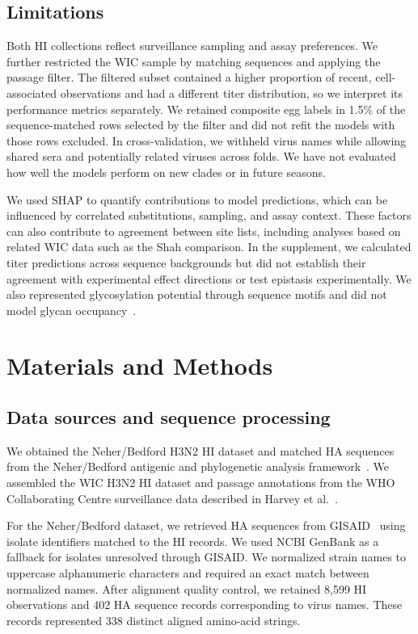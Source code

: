 \documentclass[12pt]{article}
\begin{document}
\subsection{Limitations}

Both HI collections reflect surveillance sampling and assay preferences. We further restricted the WIC sample by matching sequences and applying the passage filter. The filtered subset contained a higher proportion of recent, cell-associated observations and had a different titer distribution, so we interpret its performance metrics separately. We retained composite egg labels in 1.5\% of the sequence-matched rows selected by the filter and did not refit the models with those rows excluded. In cross-validation, we withheld virus names while allowing shared sera and potentially related viruses across folds. We have not evaluated how well the models perform on new clades or in future seasons.

We used SHAP to quantify contributions to model predictions, which can be influenced by correlated substitutions, sampling, and assay context. These factors can also contribute to agreement between site lists, including analyses based on related WIC data such as the Shah comparison. In the supplement, we calculated titer predictions across sequence backgrounds but did not establish their agreement with experimental effect directions or test epistasis experimentally. We also represented glycosylation potential through sequence motifs and did not model glycan occupancy~\cite{Das2011PNAS_glycan, Kosik2018PLoSPathog, Altman2019mBio, Zost2017PNAS}.

\section{Materials and Methods}

\subsection{Data sources and sequence processing}

We obtained the Neher/Bedford H3N2 HI dataset and matched HA sequences from the Neher/Bedford antigenic and phylogenetic analysis framework~\cite{Neher2016PNAS}. We assembled the WIC H3N2 HI dataset and passage annotations from the WHO Collaborating Centre surveillance data described in Harvey et al.~\cite{Harvey2023PLoSComputBiol}.

For the Neher/Bedford dataset, we retrieved HA sequences from GISAID~\cite{Elbe2017GlobChall, Shu2017EuroSurveillance} using isolate identifiers matched to the HI records. We used NCBI GenBank as a fallback for isolates unresolved through GISAID. We normalized strain names to uppercase alphanumeric characters and required an exact match between normalized names. After alignment quality control, we retained 8{,}599 HI observations and 402 HA sequence records corresponding to virus names. These records represented 338 distinct aligned amino-acid strings.
\end{document}
